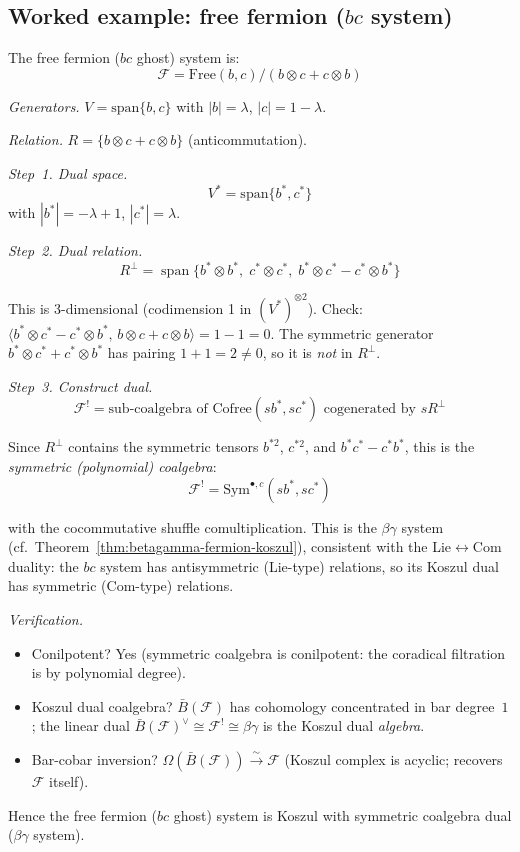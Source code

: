 \subsection{\texorpdfstring{Worked example: free fermion ($bc$ system)}{Worked example: free fermion}}

\begin{example}\label{ex:free-fermion-koszul-dual}
The free fermion ($bc$ ghost) system is:
\[\mathcal{F} = \text{Free}(b, c) / (b \otimes c + c \otimes b)\]

\emph{Generators.} $V = \text{span}\{b, c\}$ with $|b| = \lambda$,
$|c| = 1 - \lambda$.

\emph{Relation.} $R = \{b \otimes c + c \otimes b\}$ (anticommutation).

\emph{Step~1. Dual space.}
\[V^* = \text{span}\{b^*, c^*\}\]
with $|b^*| = -\lambda + 1$, $|c^*| = \lambda$.

\emph{Step~2. Dual relation.}
\[R^\perp = \operatorname{span}\{b^* \otimes b^*,\; c^* \otimes c^*,\; b^* \otimes c^* - c^* \otimes b^*\}\]

This is 3-dimensional (codimension 1 in $(V^*)^{\otimes 2}$).
Check: $\langle b^* \otimes c^* - c^* \otimes b^*,\, b \otimes c + c \otimes b \rangle = 1 - 1 = 0$.
The symmetric generator $b^* \otimes c^* + c^* \otimes b^*$ has pairing $1 + 1 = 2 \neq 0$, so it is \emph{not} in $R^\perp$.

\emph{Step~3. Construct dual.}
\[\mathcal{F}^! = \text{sub-coalgebra of } \text{Cofree}(sb^*, sc^*) \text{ cogenerated by } sR^\perp\]

Since $R^\perp$ contains the symmetric tensors $b^{*2}$, $c^{*2}$, and $b^*c^* - c^*b^*$,
this is the \emph{symmetric (polynomial) coalgebra}:
\[\mathcal{F}^! = \mathrm{Sym}^{\bullet,c}(sb^*, sc^*)\]

with the cocommutative shuffle comultiplication.
This is the $\beta\gamma$ system (cf.\ Theorem~\ref{thm:betagamma-fermion-koszul}), consistent with the Lie$\leftrightarrow$Com duality: the $bc$ system has antisymmetric (Lie-type) relations, so its Koszul dual has symmetric (Com-type) relations.

\emph{Verification.}
\begin{itemize}
\item Conilpotent? Yes (symmetric coalgebra is conilpotent: the coradical filtration is by polynomial degree).
\item Koszul dual coalgebra? $\bar{B}(\mathcal{F})$ has cohomology concentrated in bar degree~$1$; the linear dual $\bar{B}(\mathcal{F})^\vee \cong \mathcal{F}^! \cong \beta\gamma$ is the Koszul dual \emph{algebra}.
\item Bar-cobar inversion? $\Omega(\bar{B}(\mathcal{F})) \xrightarrow{\sim} \mathcal{F}$ (Koszul complex is acyclic; recovers $\mathcal{F}$ itself).
\end{itemize}

Hence the free fermion ($bc$ ghost) system is Koszul with symmetric coalgebra dual ($\beta\gamma$ system).
\end{example}

